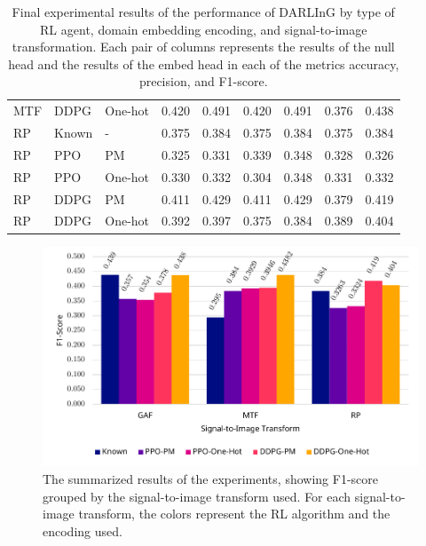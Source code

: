 \begin{table}[]
{\begin{tabular}{@{}lllrrrrrr@{}}
		MTF                  & DDPG                 & One-hot              & 0.420        & 0.491         & 0.420         & 0.491         & 0.376        & 0.438         \\
		RP                   & Known                & -                    & 0.375        & 0.384         & 0.375         & 0.384         & 0.375        & 0.384         \\
		RP                   & PPO                  & PM                   & 0.325        & 0.331         & 0.339         & 0.348         & 0.328        & 0.326         \\
		RP                   & PPO                  & One-hot              & 0.330        & 0.332         & 0.304         & 0.348         & 0.331        & 0.332         \\
		RP                   & DDPG                 & PM                   & 0.411        & 0.429         & 0.411         & 0.429         & 0.379        & 0.419         \\
		RP                   & DDPG                 & One-hot              & 0.392        & 0.397         & 0.375         & 0.384         & 0.389        & 0.404         \\ \bottomrule
	\end{tabular}
	}
	\caption{Final experimental results of the performance of DARLInG by type of RL agent, domain embedding encoding, and signal-to-image transformation. Each pair of columns represents the results of the null head and the results of the embed head in each of the metrics accuracy, precision, and F1-score.}
	\label{tab:final-results}
\end{table}

\begin{figure}
	\centering
	\includegraphics[width=6in]{figures/results_main}
	\caption{The summarized results of the experiments, showing F1-score grouped by the signal-to-image transform used. For each signal-to-image transform, the colors represent the RL algorithm and the encoding used.}
	\label{fig:results-main}
\end{figure}
	
